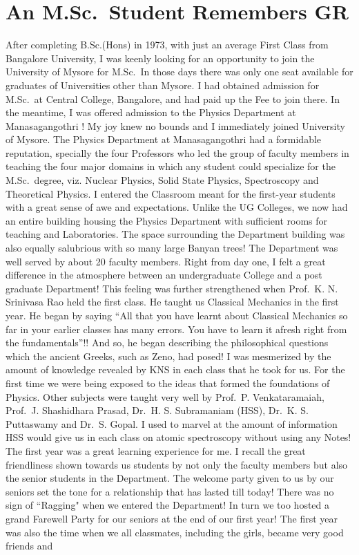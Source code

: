 \chapter{An M.Sc.\ Student Remembers GR}\label{chap18}




After completing B.Sc.(Hons) in 1973, with just an average First Class from Bangalore University, I was keenly looking for an opportunity to join the University of Mysore for M.Sc.\ In those days there was only one seat available for graduates of Universities other than Mysore. I had obtained admission for M.Sc.\ at Central College, Bangalore, and had paid up the Fee to join there. In the meantime, I was offered admission to the Physics Department at Manasagangothri ! My joy knew no bounds and I immediately joined University of Mysore. The Physics Department at Manasagangothri had a formidable reputation, specially the four Professors who led the group of faculty members in teaching the four major domains in which any student could specialize for the M.Sc.\  degree, viz. Nuclear Physics, Solid State Physics, Spectroscopy and Theoretical Physics. I entered the Classroom meant for the first-year students with a great sense of awe and expectations. Unlike the UG Colleges, we now had an entire building housing the Physics Department with sufficient rooms for teaching and Laboratories. The space surrounding the Department building was also equally salubrious with so many large Banyan trees! The Department was well served by about 20 faculty members. Right from day one, I felt a great difference in the atmosphere between an undergraduate College and a post graduate Department! This feeling was further strengthened when Prof.\ K. N. Srinivasa Rao held the first class. He taught us Classical Mechanics in the first year. He began by saying  ``All that you have learnt about Classical Mechanics so far in your earlier classes has many errors. You have to learn it afresh right from the fundamentals”!! And so, he began describing the philosophical questions which the ancient Greeks, such as Zeno, had posed! I was mesmerized by the amount of knowledge revealed by KNS in each class that he took for us. For the first time we were being exposed to the ideas that formed the foundations of Physics. Other subjects were taught very well by Prof.\ P. Venkataramaiah, Prof.\ J. Shashidhara Prasad, Dr.\ H. S. Subramaniam (HSS), Dr.\ K. S. Puttaswamy and Dr.\ S. Gopal. I used to marvel at the amount of information HSS would give us in each class on atomic spectroscopy without using any Notes! The first year was a great learning experience for me. I recall the great friendliness shown towards us students by not only the faculty members but also the senior students in the Department. The welcome party given to us by our seniors set the tone for a relationship that has lasted till today! There was no sign of ``Ragging" when we entered the Department! In turn we too hosted a grand Farewell Party for our seniors at the end of our first year! The first year was also the time when we all classmates, including the girls, became very good friends and 